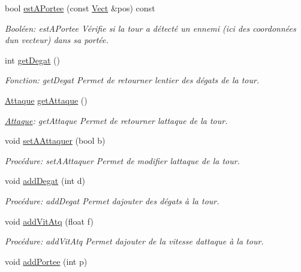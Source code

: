 \begin{DoxyCompactItemize}
bool \hyperlink{classTour_ad9f4d42370374f373f48f7d0fb36559a}{est\+A\+Portee} (const \hyperlink{classVect}{Vect} \&pos) const
\begin{DoxyCompactList}\small\item\em Booléen\+: est\+A\+Portee Vérifie si la tour a détecté un ennemi (ici des coordonnées d\textquotesingle{}un vecteur) dans sa portée. \end{DoxyCompactList}\item 
int \hyperlink{classTour_a19e9adc634af6ed58dac224ade1986b8}{get\+Degat} ()
\begin{DoxyCompactList}\small\item\em Fonction\+: get\+Degat Permet de retourner l\textquotesingle{}entier des dégats de la tour. \end{DoxyCompactList}\item 
\hyperlink{classAttaque}{Attaque} \hyperlink{classTour_a647b54e61e3ee195a5e830b3cd677197}{get\+Attaque} ()
\begin{DoxyCompactList}\small\item\em \hyperlink{classAttaque}{Attaque}\+: get\+Attaque Permet de retourner l\textquotesingle{}attaque de la tour. \end{DoxyCompactList}\item 
void \hyperlink{classTour_a045dac5adb162b2b5089507b445edae6}{set\+A\+Attaquer} (bool b)
\begin{DoxyCompactList}\small\item\em Procédure\+: set\+A\+Attaquer Permet de modifier l\textquotesingle{}attaque de la tour. \end{DoxyCompactList}\item 
void \hyperlink{classTour_a61f75da2910e077d28121b04f7e6e747}{add\+Degat} (int d)
\begin{DoxyCompactList}\small\item\em Procédure\+: add\+Degat Permet d\textquotesingle{}ajouter des dégats à la tour. \end{DoxyCompactList}\item 
void \hyperlink{classTour_a954d1151a9fbc182adde53b28fc7cc26}{add\+Vit\+Atq} (float f)
\begin{DoxyCompactList}\small\item\em Procédure\+: add\+Vit\+Atq Permet d\textquotesingle{}ajouter de la vitesse d\textquotesingle{}attaque à la tour. \end{DoxyCompactList}\item 
void \hyperlink{classTour_af6ead0d33253a3400b65efb1a576d215}{add\+Portee} (int p)

\end{DoxyCompactItemize}
